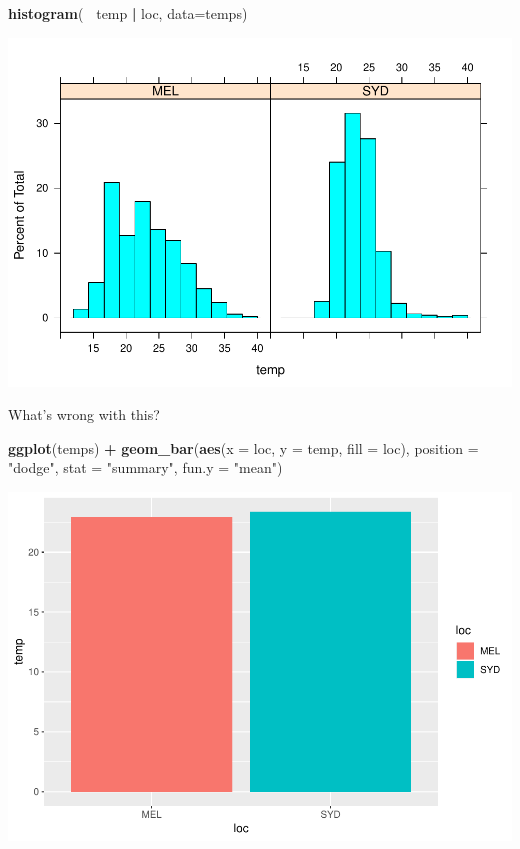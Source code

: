 \documentclass[]{article}
\newenvironment{Shaded}{\begin{snugshade}}{\end{snugshade}}
\newcommand{\DataTypeTok}[1]{\textcolor[rgb]{0.13,0.29,0.53}{#1}}
\newcommand{\KeywordTok}[1]{\textcolor[rgb]{0.13,0.29,0.53}{\textbf{#1}}}
\newcommand{\NormalTok}[1]{#1}
\newcommand{\OperatorTok}[1]{\textcolor[rgb]{0.81,0.36,0.00}{\textbf{#1}}}
\newcommand{\StringTok}[1]{\textcolor[rgb]{0.31,0.60,0.02}{#1}}
\begin{document}
\begin{Shaded}
\begin{Highlighting}[]
\KeywordTok{histogram}\NormalTok{(}\OperatorTok{~}\StringTok{ }\NormalTok{temp }\OperatorTok{|}\StringTok{ }\NormalTok{loc, }\DataTypeTok{data=}\NormalTok{temps)}
\end{Highlighting}
\end{Shaded}

\includegraphics{AT2_template__medium__files/figure-latex/unnamed-chunk-4-1.pdf}

What's wrong with this?

\begin{Shaded}
\begin{Highlighting}[]
\KeywordTok{ggplot}\NormalTok{(temps) }\OperatorTok{+}\StringTok{ }
\StringTok{  }\KeywordTok{geom_bar}\NormalTok{(}\KeywordTok{aes}\NormalTok{(}\DataTypeTok{x =}\NormalTok{ loc, }\DataTypeTok{y =}\NormalTok{ temp, }\DataTypeTok{fill =}\NormalTok{ loc),}
           \DataTypeTok{position =} \StringTok{"dodge"}\NormalTok{, }\DataTypeTok{stat =} \StringTok{"summary"}\NormalTok{, }\DataTypeTok{fun.y =} \StringTok{"mean"}\NormalTok{)}
\end{Highlighting}
\end{Shaded}

\includegraphics{AT2_template__medium__files/figure-latex/unnamed-chunk-5-1.pdf}
\end{document}
